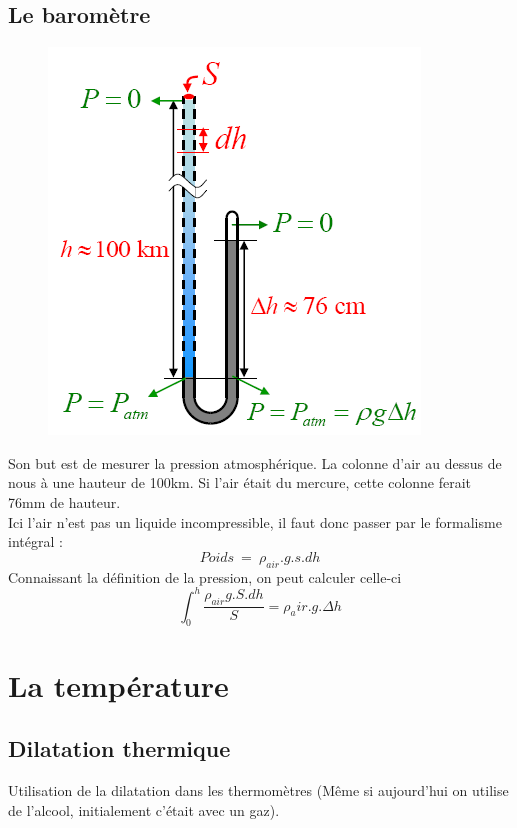 \documentclass	[11pt, a4paper, openany]{book}
\begin{document}
\subsection{Le baromètre}
\begin{figure}
	\includegraphics[scale=0.3]{th/image2.png}
\end{figure}
Son but est de mesurer la pression atmosphérique. La colonne d'air au dessus de nous à une hauteur de 100km. Si l'air était du mercure, cette colonne ferait 76mm de hauteur. \\

Ici l'air n'est pas un liquide incompressible, il faut donc passer par le formalisme intégral : 
\begin{equation}
	Poids\ =\ \rho_{air}.g.s.dh
\end{equation}
Connaissant la définition de la pression, on peut calculer celle-ci
\begin{equation}
	\int_0^h \frac{\rho_{air}g.S.dh}{S} = \rho_air.g.\Delta h
\end{equation}

\section{La température}
\subsection{Dilatation thermique}
Utilisation de la dilatation dans les thermomètres (Même si aujourd'hui on utilise de l'alcool, initialement c'était avec un gaz).
\end{document}
